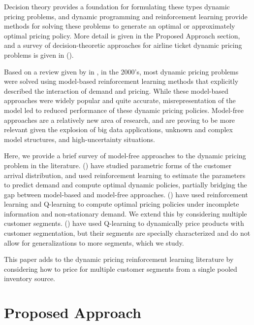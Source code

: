 \documentclass[letterpaper]{article}%
\begin{document}
Decision theory provides a foundation for formulating these types dynamic pricing problems, and dynamic programming and reinforcement learning provide methods for solving these problems to generate an optimal or approximately optimal pricing policy. More detail is given in the Proposed Approach section, and a survey of decision-theoretic approaches for airline ticket dynamic pricing problems is given in \citeauthor{Abdella2019} (\citeyear{Abdella2019}).

Based on a review given by \citeauthor{Rana2014Real-timeLearning} in \citeyear{Rana2014Real-timeLearning}, in the 2000's, most dynamic pricing problems were solved using model-based reinforcement learning methods that explicitly described the interaction of demand and pricing. While these model-based approaches were widely popular and quite accurate, misrepresentation of the model led to reduced performance of these dynamic pricing policies. Model-free approaches are a relatively new area of research, and are proving to be more relevant given the explosion of big data applications, unknown and complex model structures, and high-uncertainty situations. 

Here, we provide a brief survey of model-free approaches to the dynamic pricing problem in the literature. \citeauthor{Carvalho2003DynamicLearning} (\citeyear{Carvalho2003DynamicLearning}) have studied parametric forms of the customer arrival distribution, and used reinforcement learning to estimate the parameters to predict demand and compute optimal dynamic policies, partially bridging the gap between model-based and model-free approaches. \citeauthor{Rana2014Real-timeLearning} (\citeyear{Rana2014Real-timeLearning}) have used reinforcement learning and Q-learning to compute optimal pricing policies under incomplete information and non-stationary demand. We extend this by considering multiple customer segments. \citeauthor{Raju2006LearningSegmentation} (\citeyear{Raju2006LearningSegmentation}) have used Q-learning to dynamically price products with customer segmentation, but their segments are specially characterized and do not allow for generalizations to more segments, which we study.

This paper adds to the dynamic pricing reinforcement learning literature by considering how to price for multiple customer segments from a single pooled inventory source.

\section{Proposed Approach}
\end{document}
